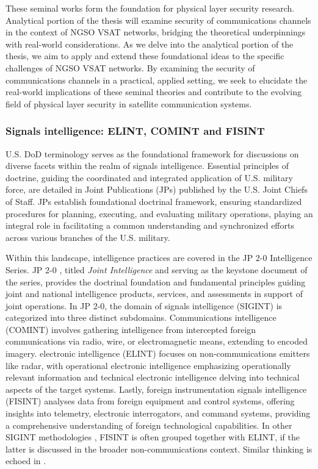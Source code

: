 \documentclass[english, 12pt, a4paper, elec, utf8, a-1b, online]{aaltothesis}
\begin{document}
These seminal works form the foundation for physical layer security research.
Analytical portion of the thesis will examine security of communications channels in the context of NGSO VSAT networks, bridging the theoretical underpinnings with real-world considerations.
As we delve into the analytical portion of the thesis, we aim to apply and extend these foundational ideas to the specific challenges of NGSO VSAT networks.
By examining the security of communications channels in a practical, applied setting, we seek to elucidate the real-world implications of these seminal theories and contribute to the evolving field of physical layer security in satellite communication systems.


\subsubsection{Signals intelligence: ELINT, COMINT and FISINT}
U.S. DoD terminology serves as the foundational framework for discussions on diverse facets within the realm of signals intelligence.
Essential principles of doctrine, guiding the coordinated and integrated application of U.S. military force, are detailed in Joint Publications (JPs) published by the U.S. Joint Chiefs of Staff.
JPs establish foundational doctrinal framework, ensuring standardized procedures for planning, executing, and evaluating military operations, playing an integral role in facilitating a common understanding and synchronized efforts across various branches of the U.S. military.

Within this landscape, intelligence practices are covered in the JP 2-0 Intelligence Series.
JP 2-0 \cite{jp2-0}, titled \textit{Joint Intelligence} and serving as the keystone document of the series, provides the doctrinal foundation and fundamental principles guiding joint and national intelligence products, services, and assessments in support of joint operations.
In JP 2-0, the domain of signals intelligence (SIGINT) is categorized into three distinct subdomains. Communications intelligence (COMINT) involves gathering intelligence from intercepted foreign communications via radio, wire, or electromagnetic means, extending to encoded imagery.
electronic intelligence (ELINT) focuses on non-communications emitters like radar, with operational electronic intelligence emphasizing operationally relevant information and technical electronic intelligence delving into technical aspects of the target systems.
Lastly, foreign instrumentation signals intelligence (FISINT) analyses data from foreign equipment and control systems, offering insights into telemetry, electronic interrogators, and command systems, providing a comprehensive understanding of foreign technological capabilities.
In other SIGINT methodologies \cite{kosola2013digitaalinen}, FISINT is often grouped together with ELINT, if the latter is discussed in the broader non-communications context.
Similar thinking is echoed in \cite{national2015bulk}.
\end{document}
